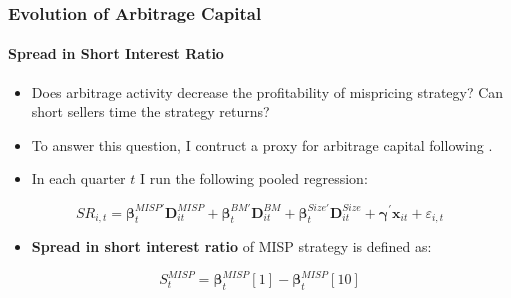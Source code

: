\documentclass{beamer}
\begin{document}
\begin{frame}
	\frametitle{Evolution of Arbitrage Capital}
	\framesubtitle{Spread in Short Interest Ratio}
	\begin{itemize}
		\item Does arbitrage activity decrease the profitability of mispricing strategy? Can short sellers time the strategy returns?   
		\item To answer this question, I contruct a proxy for arbitrage capital following  \citet{Hanson2014}. 		
		\item In each quarter $t$ I run the following pooled regression:
	\end{itemize}
\vspace*{0.3cm}
		\begin{equation} \nonumber
			SR_{i,t} = \bm{\beta}^{MISP\prime}_{t}  \bm{D}^{MISP}_{it} +\bm{\beta}^{BM\prime}_{t}  \bm{D}^{BM}_{it}+\bm{\beta}^{Size\prime}_{t}  \bm{D}^{Size}_{it}   +\bm{\gamma}^\prime \bm{x}_{it} + \varepsilon_{i,t}
		\end{equation}
\begin{itemize}
\item \textbf{Spread in short interest ratio} of MISP strategy is defined as:
\end{itemize}
\vspace*{0.3cm}
\begin{equation} \nonumber
			S^{MISP}_{t} = \bm{\beta}^{MISP}_t[1] - \bm{\beta}^{MISP}_{t}[10]
		\end{equation}
\end{frame} 
\end{document}
